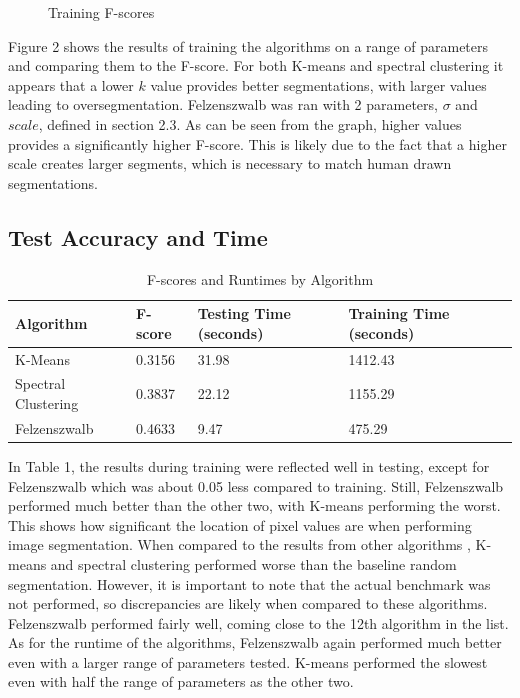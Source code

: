 \documentclass[12pt]{extarticle}
\begin{document}
\begin{figure}[!h]
\begin{subfigure}[b]{\textwidth}
        \caption{}
        \label{fig:f3}
      \end{subfigure}
      \caption{Training F-scores}
    \end{figure}

    Figure 2 shows the results of training the algorithms on a range of
    parameters and comparing them to the F-score. For both K-means and 
    spectral clustering it appears that a lower $k$ value provides better
    segmentations, with larger values leading to oversegmentation.
    Felzenszwalb was ran with 2 parameters, $\sigma$ and $scale$, defined in 
    section 2.3. As can be seen from the graph, higher values provides a 
    significantly higher F-score. This is likely due to the fact that a higher
    scale creates larger segments, which is necessary to match human drawn
    segmentations.

    \newpage

  \subsection{Test Accuracy and Time}

    \begin{table}[h!]
      \begin{tabular}{lllll}
      \hline
      Algorithm           & F-score & Testing Time (seconds) & Training Time (seconds) &  \\ \hline
      K-Means             & 0.3156  & 31.98                  & 1412.43                 &  \\
      Spectral Clustering & 0.3837  & 22.12                  & 1155.29                 &  \\
      Felzenszwalb        & 0.4633  & 9.47                   & 475.29                  &  \\ \hline
      \end{tabular}
      \caption{F-scores and Runtimes by Algorithm}
    \end{table}

    In Table 1, the results during training were reflected well in testing, except for Felzenszwalb
    which was about 0.05 less compared to training. Still, Felzenszwalb
    performed much better than the other two, with K-means performing the worst.
    This shows how significant the location of pixel values are when performing
    image segmentation. When compared to the results from other algorithms
    \cite{performance}, K-means and spectral clustering performed worse than
    the baseline random segmentation. However, it is important to note that 
    the actual benchmark was not performed, so discrepancies are likely when
    compared to these algorithms. Felzenszwalb performed fairly well, coming
    close to the 12th algorithm in the list. As for the runtime of the algorithms,
    Felzenszwalb again performed much better even with a larger range of
    parameters tested. K-means performed the slowest even with half the range 
    of parameters as the other two.
\end{document}
